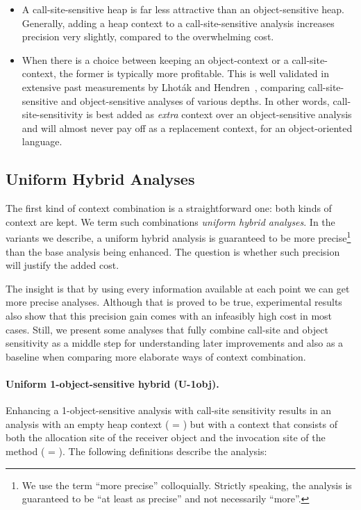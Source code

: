 \begin{itemize}
\item A call-site-sensitive heap is far less attractive than an object-sensitive heap. Generally, adding a heap context to a call-site-sensitive analysis increases precision very slightly, compared to the overwhelming cost.

\item When there is a choice between keeping an object-context or a call-site-context, the former is typically more profitable. This is well validated in extensive past measurements by Lhot\'{a}k and Hendren~\cite{article:2008:tosem:Lhotak}, comparing call-site-sensitive and object-sensitive analyses of various depths. In other words, call-site-sensitivity is best added as \emph{extra} context over an object-sensitive analysis and will almost never pay off as a replacement context, for an object-oriented language.
\end{itemize}


\subsection{Uniform Hybrid Analyses}

The first kind of context combination is a straightforward one: both kinds of context are kept. We term such combinations \emph{uniform hybrid analyses}. In the variants we describe, a uniform hybrid analysis is guaranteed to be more precise\footnote{We use the term ``more precise'' colloquially. Strictly speaking, the analysis is guaranteed to be ``at least as precise'' and not necessarily ``more''.} than the base analysis being enhanced. The question is whether such precision will justify the added cost.

The insight is that by using every information available at each point we can get more precise analyses. Although that is proved to be true, experimental results also show that this precision gain comes with an infeasibly high cost in most cases. Still, we present some analyses that fully combine call-site and object sensitivity as a middle step for understanding later improvements and also as a baseline when comparing more elaborate ways of context combination.

\paragraph[Uniform 1-object-sensitive]{Uniform 1-object-sensitive hybrid (U-1obj).}
Enhancing a 1-object-sensitive analysis with call-site sensitivity results in an analysis with an empty heap context ( = \args{\{$\star$\}}) but with a context that consists of both the allocation site of the receiver object and the invocation site of the method ( = ). The following definitions describe the analysis:

